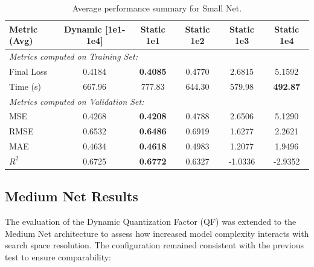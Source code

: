 \begin{table}[h]
\centering
\scriptsize
\begin{tabular}{|l|c|c|c|c|c|}
\hline
\textbf{Metric (Avg)} & \textbf{Dynamic [1e1-1e4]} & \textbf{Static 1e1} & \textbf{Static 1e2} & \textbf{Static 1e3} & \textbf{Static 1e4} \\ \hline
\multicolumn{6}{|l|}{\textit{Metrics computed on Training Set:}} \\ \hline
Final Loss            & 0.4184                     & \textbf{0.4085}               & 0.4770               & 2.6815               & 5.1592               \\ \hline
Time (s)              & 667.96                     & 777.83               & 644.30               & 579.98               & \textbf{492.87}               \\ \hline
\multicolumn{6}{|l|}{\textit{Metrics computed on Validation Set:}} \\ \hline
MSE                   & 0.4268                     & \textbf{0.4208}               & 0.4788               & 2.6506               & 5.1290               \\ \hline
RMSE                  & 0.6532                     & \textbf{0.6486}               & 0.6919               & 1.6277               & 2.2621               \\ \hline
MAE                   & 0.4634                     & \textbf{0.4618}               & 0.4983               & 1.2077               & 1.9496               \\ \hline
$R^2$                 & 0.6725                     & \textbf{0.6772}               & 0.6327               & -1.0336              & -2.9352              \\ \hline
\end{tabular}
\caption{Average performance summary for Small Net.}
\label{tab:small_net_quant_results}
\end{table}

\newpage

\subsection{Medium Net Results}

The evaluation of the Dynamic Quantization Factor (QF) was extended to the Medium Net architecture to assess how increased model complexity interacts with search space resolution. The configuration remained consistent with the previous test to ensure comparability:

